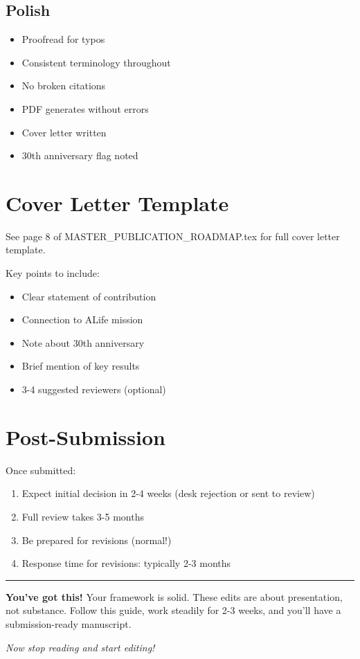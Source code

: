 \documentclass[11pt]{article}
\begin{document}
\subsection{Polish}
\begin{itemize}[label=$\square$]
    \item Proofread for typos
    \item Consistent terminology throughout
    \item No broken citations
    \item PDF generates without errors
    \item Cover letter written
    \item 30th anniversary flag noted
\end{itemize}

\section{Cover Letter Template}

\begin{tcolorbox}[colback=blue!10,colframe=blue]
See page 8 of MASTER\_PUBLICATION\_ROADMAP.tex for full cover letter template.

Key points to include:
\begin{itemize}
    \item Clear statement of contribution
    \item Connection to ALife mission
    \item Note about 30th anniversary
    \item Brief mention of key results
    \item 3-4 suggested reviewers (optional)
\end{itemize}
\end{tcolorbox}

\section{Post-Submission}

Once submitted:
\begin{enumerate}
    \item Expect initial decision in 2-4 weeks (desk rejection or sent to review)
    \item Full review takes 3-5 months
    \item Be prepared for revisions (normal!)
    \item Response time for revisions: typically 2-3 months
\end{enumerate}

\vspace{2em}
\hrule
\vspace{1em}

\textbf{You've got this!} Your framework is solid. These edits are about presentation, not substance. Follow this guide, work steadily for 2-3 weeks, and you'll have a submission-ready manuscript.

\textit{Now stop reading and start editing!}
\end{document}
